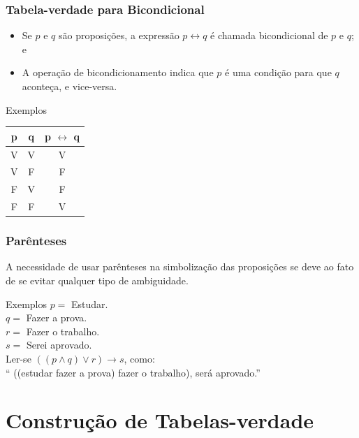 \documentclass{beamer}
\begin{document}
\begin{frame}
\frametitle{Tabela-verdade para Bicondicional}

\begin{itemize}
\item Se $p$ e $q$ são proposições, a expressão $p \leftrightarrow q$ é chamada bicondicional de $p$ e $q$; e
\item A operação de bicondicionamento indica que $p$ é uma condição para que $q$ aconteça, e vice-versa.
\end{itemize} \vfill

\begin{exampleblock}{Exemplos}
\center
\begin{tabular}{|c|c|c|}
	\hline
	\textbf{p} & \textbf{q} & \textbf{p $\leftrightarrow$ q}\\ \hline
	V & V & V \\ \hline
	V & F & F \\ \hline
	F & V & F \\ \hline
	F & F & V \\ \hline
\end{tabular}
\end{exampleblock}
\end{frame}

\begin{frame}
\frametitle{Parênteses}

A necessidade de usar parênteses na simbolização das proposições se deve ao fato de se evitar qualquer tipo de ambiguidade.\vfill

\begin{exampleblock}{Exemplos}
$p =$ Estudar.\\
$q =$ Fazer a prova.\\
$r =$ Fazer o trabalho.\\
$s =$ Serei aprovado.\\
Ler-se $((p \wedge q) \vee r) \rightarrow s$, como:\\
`` ((estudar  fazer a prova)  fazer o trabalho),  será aprovado.''
\end{exampleblock}
\end{frame}

\section{Construção de Tabelas-verdade}
\end{document}
